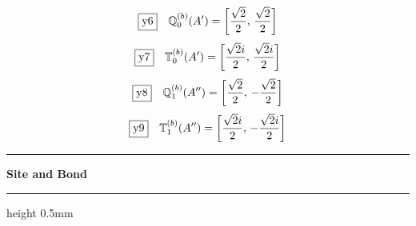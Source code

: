 \documentclass[fleqn,10pt,landscape]{jsarticle}
\begin{document}
\begin{dmath*}
\fbox{y6}\quad \mathbb{Q}_{0}^{(b)}(A^{\prime})=\left[ \frac{\sqrt{2}}{2},\, \frac{\sqrt{2}}{2} \right]
\end{dmath*}
\begin{dmath*}
\fbox{y7}\quad \mathbb{T}_{0}^{(b)}(A^{\prime})=\left[ \frac{\sqrt{2} i}{2},\, \frac{\sqrt{2} i}{2} \right]
\end{dmath*}
\begin{dmath*}
\fbox{y8}\quad \mathbb{Q}_{1}^{(b)}(A^{\prime\prime})=\left[ \frac{\sqrt{2}}{2},\, - \frac{\sqrt{2}}{2} \right]
\end{dmath*}
\begin{dmath*}
\fbox{y9}\quad \mathbb{T}_{1}^{(b)}(A^{\prime\prime})=\left[ \frac{\sqrt{2} i}{2},\, - \frac{\sqrt{2} i}{2} \right]
\end{dmath*}
\vspace{5mm}
\noindent \rule[0.5mm]{5mm}{0.5mm}\hspace{3mm}\textbf{Site and Bond}\hspace{3mm}\leaders\hrule height 0.5mm\hfill\kern0pt
\vspace{3mm}
\end{document}
